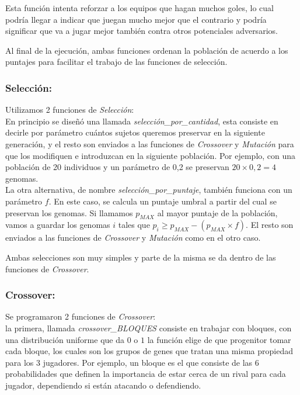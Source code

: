 Esta función intenta reforzar a los equipos que hagan muchos goles, lo cual podría llegar a indicar que juegan mucho mejor que el
contrario y podría significar que va a jugar mejor también contra otros potenciales adversarios.


Al final de la ejecución, ambas funciones ordenan la población de acuerdo a los puntajes para facilitar el trabajo de las funciones
de selección.


\subsubsection{Selección:} \label{genetico-seleccion}

Utilizamos 2 funciones de \emph{Selección}:\\

En principio se diseñó una llamada \emph{selección\_por\_cantidad}, esta consiste en decirle por parámetro cuántos
sujetos queremos preservar en la siguiente generación, y el resto son enviados a las funciones de \emph{Crossover} y \emph{Mutación} para que
los modifiquen e introduzcan en la siguiente población.
Por ejemplo, con una población de 20 individuos y un parámetro de 0,2 se preservan $20 \times 0,2 = 4$ genomas.\\

La otra alternativa, de nombre \emph{selección\_por\_puntaje}, también funciona con un parámetro $f$. En este caso, se calcula un puntaje umbral
 a partir del cual se preservan los genomas. Si llamamos $p_{MAX}$ al mayor puntaje de la población, vamos a guardar
 los genomas $i$ tales que $p_{i} \geq p_{MAX} - (p_{MAX} \times f)$.
El resto son enviados a las funciones de \emph{Crossover} y \emph{Mutación} como en el otro caso.


Ambas selecciones son muy simples y parte de la misma se da dentro de las funciones de \emph{Crossover}.

\subsubsection{Crossover:}
Se programaron 2 funciones de \emph{Crossover}:\\

la primera, llamada \emph{crossover\_BLOQUES} consiste en trabajar con bloques, con una distribución uniforme que da $0$ o $1$
la función elige de que progenitor tomar cada bloque, los cuales son los grupos de genes que tratan una misma propiedad para los
3 jugadores. Por ejemplo, un bloque es el que consiste de las 6 probabilidades que definen la importancia de estar cerca de un rival
para cada jugador, dependiendo si están atacando o defendiendo.\\


